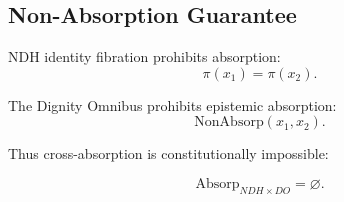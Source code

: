 
\subsection{Non-Absorption Guarantee}

NDH identity fibration prohibits absorption:
\[
\pi(x_1) = \pi(x_2).
\]

The Dignity Omnibus prohibits epistemic absorption:
\[
\mathrm{NonAbsorp}(x_1, x_2).
\]

Thus cross-absorption is constitutionally impossible:

\[
\mathrm{Absorp}_{NDH \times DO} = \varnothing.
\]

